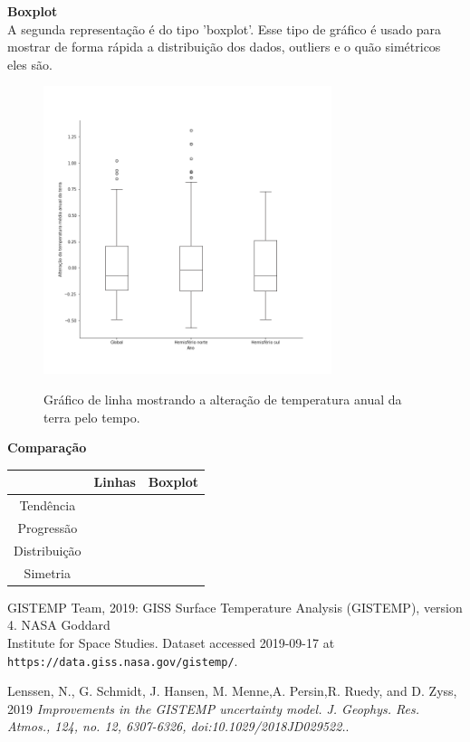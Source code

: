 \documentclass[12pt]{article}
\begin{document}
\textbf{\Large Boxplot}\\
A segunda representação é do tipo 'boxplot'. Esse tipo de gráfico é usado para mostrar de forma rápida a distribuição dos dados, outliers e o quão simétricos eles são.
\setcounter{figure}{1}
\begin{figure}[H]
	\centering
	\includegraphics[width = 0.75\textwidth]{boxplot.png}
	\label{fig:A.2}
	\caption{Gráfico de linha mostrando a alteração de temperatura anual da terra pelo tempo.}
\end{figure}

\textbf{\Large Comparação}
\begin{center}
	\begin{tabular}{ |c|c|c| } 
		\hline
		 	  & Linhas & Boxplot \\ 
		\hline
		Tendência &  &  \\ 
		\hline
		Progressão &  &  \\ 
		\hline
		Distribuição &  &  \\ 
		\hline
		Simetria &  &  \\ 
		\hline
	\end{tabular}
\end{center}
\newpage
\begin{thebibliography}{9}
	GISTEMP Team, 2019: GISS Surface Temperature Analysis (GISTEMP), version 4. NASA Goddard \\
	Institute for Space Studies. Dataset accessed 2019-09-17 at \\\texttt{https://data.giss.nasa.gov/gistemp/}.
	
	Lenssen, N., G. Schmidt, J. Hansen, M. Menne,A. Persin,R. Ruedy, and D. Zyss, 2019 
	\textit{Improvements in the GISTEMP uncertainty model. J. Geophys. Res. Atmos., 124, no. 12, 6307-6326, doi:10.1029/2018JD029522.}.
\end{thebibliography}
\end{document}
